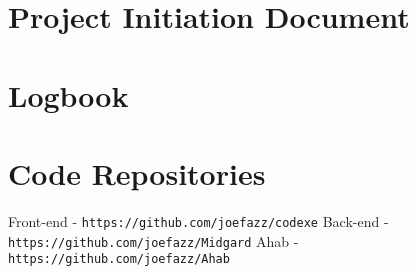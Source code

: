 \begin{appendices}
\chapter{Project Initiation Document}


\chapter{Logbook}


\chapter{Code Repositories}
Front-end - \texttt{https://github.com/joefazz/codexe}
Back-end - \texttt{https://github.com/joefazz/Midgard}
Ahab - \texttt{https://github.com/joefazz/Ahab}
\end{appendices}
